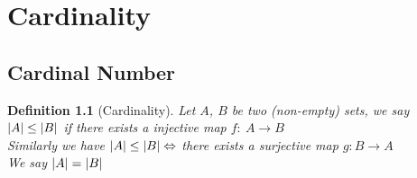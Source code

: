 \chapter{Cardinality}
\newtheorem*{myDef}{Definition}
\newtheorem*{myTheo}{Theorem}
\newtheorem*{myPf}{Proof}
\newtheorem*{myLemma}{Lemma}
\newtheorem*{myProp}{Proposal}

\section{Cardinal Number}
\begin{myDef}[Cardinality]
Let $A$, $B$ be two (non-empty) sets, we say  $\lvert A\rvert\leq\lvert B\rvert$ if there exists a injective map $f:\ A\rightarrow B$
\\
Similarly we have $\lvert A\rvert\leq \lvert B\rvert \Leftrightarrow$ there exists a surjective map $g: B\rightarrow A$
\\
We say $\lvert A\rvert = \lvert B\rvert $
\end{myDef}


